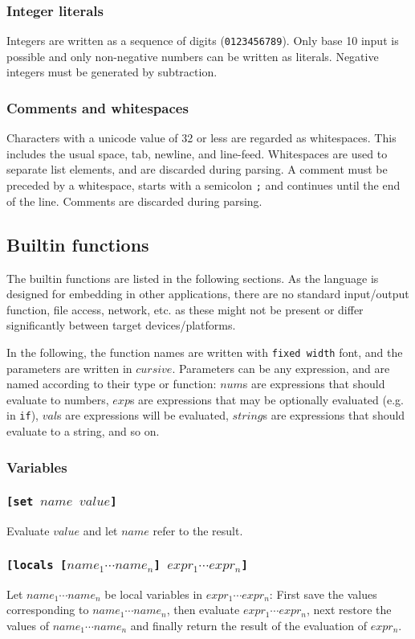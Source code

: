 \documentclass[11pt]{report}
\begin{document}
\subsubsection{Integer literals}

Integers are written as a sequence of digits (\verb|0123456789|). Only base 10 input is possible and only non-negative numbers can be written as literals. Negative integers must be generated by subtraction.

\subsubsection{Comments and whitespaces}
Characters with a unicode value of 32 or less are regarded as whitespaces. This includes the usual space, tab, newline, and line-feed. Whitespaces are used to separate list elements, and are discarded during parsing. A comment must be preceded by a whitespace, starts with a semicolon \verb|;| and continues until the end of the line. Comments are discarded during parsing.

\subsection{Builtin functions}
The builtin functions are listed in the following sections. As the language is designed for embedding in other applications, there are no standard input/output function, file access, network, etc. as these might not be present or differ significantly between target devices/platforms.

In the following, the function names are written with {\tt fixed width} font, and the parameters are written in $cursive$. Parameters can be any expression, and are named according to their type or function: $num$s are expressions that should evaluate to numbers, $exp$s are expressions that may be optionally evaluated (e.g. in {\tt if}), $val$s are expressions will be evaluated, $string$s are expressions that should evaluate to a string, and so on.

\subsubsection{Variables}
\subsubsection*{\tt{[set }$name$ $value$\tt{]}}
Evaluate $value$ and let $name$ refer to the result.

\subsubsection*{\tt{[locals [}$name_1 \cdots name_n$\tt{]} $expr_1 \cdots expr_n$\tt{]}}
Let $name_1 \cdots name_n$ be local variables in $expr_1 \cdots expr_n$: First save the values corresponding to $name_1 \cdots name_n$, then evaluate $expr_1 \cdots expr_n$, next restore the values of $name_1 \cdots name_n$ and finally return the result of the evaluation of $expr_n$.
\end{document}
